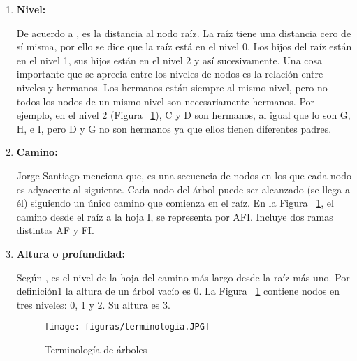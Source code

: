 \documentclass[10pt,conference]{IEEEtran}
\begin{document}
\begin{enumerate}[]
    \item {\textbf{Nivel:}}
    \par De acuerdo a \citep{gonzalez}, es la distancia al nodo raíz. La raíz tiene una distancia cero de sí misma, por ello se dice que la raíz está en el nivel 0. Los hijos del raíz están en el nivel 1, sus hijos están en el nivel 2 y así sucesivamente. Una cosa importante que se aprecia entre los niveles de nodos es la relación entre niveles y hermanos. Los hermanos están siempre al mismo nivel, pero no todos los nodos de un mismo nivel son necesariamente hermanos. Por ejemplo, en el nivel 2 (Figura ~\ref{farbter}), C y D son hermanos, al igual que lo son G, H, e I, pero D y G no son hermanos ya que ellos tienen diferentes padres.
    \item {\textbf{Camino:}}
    \par \citep{jorgeestructuras} Jorge Santiago menciona que, es una secuencia de nodos en los que cada nodo es adyacente al siguiente. Cada nodo del árbol puede ser alcanzado (se llega a él) siguiendo un único camino que comienza en el raíz. En la Figura ~\ref{farbter}, el camino desde el raíz a la hoja I, se representa por AFI. Incluye dos ramas distintas AF y FI.
    \item {\textbf{Altura o profundidad:}}
    \par Según \citep{pera}, es el nivel de la hoja del camino más largo desde la raíz más uno. Por definición1 la altura de un árbol vacío es 0. La Figura ~\ref{farbter} contiene nodos en tres niveles: 0, 1 y 2. Su altura es 3.
    \begin{figure}[H]
    \begin{center}
       \texttt{[image: figuras/terminologia.JPG]}
      \caption{Terminología de árboles}
      \label{farbter} 
      \end{center}
    \end{figure}
\end{enumerate}

\end{document}
